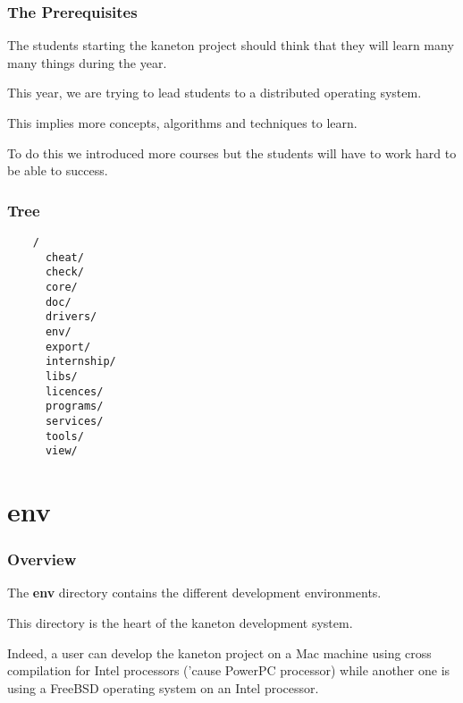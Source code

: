 {\begin{frame}
  \frametitle{The Prerequisites}

  The students starting the kaneton project should think that they
  will learn many many things during the year.

  \nl

  This year, we are trying to lead students to a distributed operating
  system.

  \nl

  This implies more concepts, algorithms and techniques to learn.

  \nl

  To do this we introduced more courses but the students will have
  to work hard to be able to success.
\end{frame}


\begin{frame}[containsverbatim]
  \frametitle{Tree}

  \begin{center}

  \begin{verbatim}
    /
      cheat/
      check/
      core/
      doc/
      drivers/
      env/
      export/
      internship/
      libs/
      licences/
      programs/
      services/
      tools/
      view/
  \end{verbatim}

  \end{center}
\end{frame}

%
%

\section{env}


\begin{frame}
  \frametitle{Overview}

  The \textbf{env} directory contains the different development environments.

  \nl

  This directory is the heart of the kaneton development system.

  \nl

  Indeed, a user can develop the kaneton project on a Mac machine using
  cross compilation for Intel processors ('cause PowerPC processor)
  while another one is using a FreeBSD operating system on an Intel processor.


\end{frame}}
